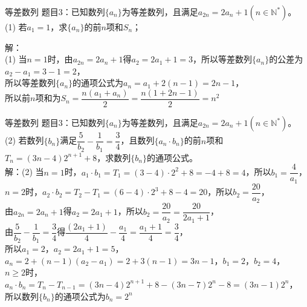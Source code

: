 \documentclass[aspectratio=169]{ctexbeamer} %
\date{\today}
\begin{document}
\begin{frame}[t]{等差数列}
题目3：已知数列$\{a_n\}$为等差数列，且满足$a_{2n} = 2a_n + 1(n \in \mathbb{N^*})$。\\
(1) 若$a_1 = 1$，求$\{a_n\}$的前$n$项和$S_n$；\\
\pause
\vspace{1cm}

解：\\
(1) 当$n = 1$时，由$a_{2n} = 2a_n + 1$得$a_2 = 2a_1 + 1 = 3$，所以等差数列$\{a_n\}$的公差为$a_2 - a_1 = 3 - 1 = 2$，\\
\pause
所以等差数列$\{a_n\}$的通项公式为$a_n = a_1 + 2(n-1) = 2n - 1$，\\
\pause
所以前$n$项和为$S_n = \dfrac{n(a_1 + a_n)}{2} = \dfrac{n(1+2n-1)}{2} = n^2$ \\
\pause

\end{frame}

\begin{frame}[t]{等差数列}
题目3：已知数列$\{a_n\}$为等差数列，且满足$a_{2n} = 2a_n + 1(n \in \mathbb{N^*})$。\\
(2) 若数列$\{b_n\}$满足$\dfrac{5}{b_2} - \dfrac{1}{b_1} = \dfrac{3}{4}$，且数列$\{a_n \cdot b_n\}$的前$n$项和$T_n = (3n - 4)2^{n+1} + 8$，求数列$\{b_n\}$的通项公式。\\
\pause
解：(2) 当$n = 1$时，$a_1 \cdot b_1 = T_1 = (3-4) \cdot 2^2 + 8 = -4 + 8 = 4$，所以$b_1 = \dfrac{4}{a_1}$，\\
\pause
$n = 2$时，$a_2 \cdot b_2 = T_2 - T_1 = (6-4) \cdot 2^3 + 8 - 4 = 20$，所以$b_2 = \dfrac{20}{a_2}$，\\
\pause
由$a_{2n} = 2a_n + 1$得$a_2 = 2a_1 + 1$，所以$b_2 = \dfrac{20}{a_2} = \dfrac{20}{2a_1 + 1}$， \\
\pause
由$\dfrac{5}{b_2} - \dfrac{1}{b_1} = \dfrac{3}{4}$得$\dfrac{(2a_1 + 1)}{4} - \dfrac{a_1}{4} = \dfrac{a_1+1}{4} = \dfrac{3}{4}$， \\
\pause
所以$a_1 = 2$，$a_2 = 2a_1 + 1 = 5$，$a_n = 2 + (n-1)(a_2 - a_1) = 2 +3(n-1) = 3n - 1$，$b_1 = 2$，$b_2 = 4$，\\
\pause
$n \ge 2$时，$a_n \cdot b_n = T_n - T_{n-1} = (3n-4)2^{n+1} + 8 - (3n-7)2^n - 8 = (3n-1)2^n$，\\
\pause
所以数列$\{b_n\}$的通项公式为$b_n = 2^n$
\end{frame}
\end{document}
